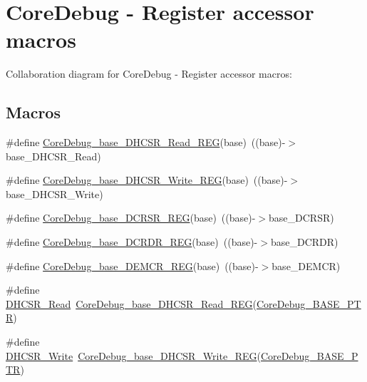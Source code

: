 \hypertarget{group___core_debug___register___accessor___macros}{}\section{Core\+Debug -\/ Register accessor macros}
\label{group___core_debug___register___accessor___macros}
Collaboration diagram for Core\+Debug -\/ Register accessor macros\+:
\subsection*{Macros}
\begin{DoxyCompactItemize}
\item 
\#define \hyperlink{group___core_debug___register___accessor___macros_gac833b7540ffafe000016ddc394a9d147}{Core\+Debug\+\_\+base\+\_\+\+D\+H\+C\+S\+R\+\_\+\+Read\+\_\+\+R\+EG}(base)~((base)-\/$>$base\+\_\+\+D\+H\+C\+S\+R\+\_\+\+Read)
\item 
\#define \hyperlink{group___core_debug___register___accessor___macros_ga47ea32822d2a6f5acea35f2d8859f111}{Core\+Debug\+\_\+base\+\_\+\+D\+H\+C\+S\+R\+\_\+\+Write\+\_\+\+R\+EG}(base)~((base)-\/$>$base\+\_\+\+D\+H\+C\+S\+R\+\_\+\+Write)
\item 
\#define \hyperlink{group___core_debug___register___accessor___macros_ga8b45e5b041ad90bbee03fb1431487fee}{Core\+Debug\+\_\+base\+\_\+\+D\+C\+R\+S\+R\+\_\+\+R\+EG}(base)~((base)-\/$>$base\+\_\+\+D\+C\+R\+SR)
\item 
\#define \hyperlink{group___core_debug___register___accessor___macros_ga3ee2f6e86a62ec00d4a06ecf8b320c5e}{Core\+Debug\+\_\+base\+\_\+\+D\+C\+R\+D\+R\+\_\+\+R\+EG}(base)~((base)-\/$>$base\+\_\+\+D\+C\+R\+DR)
\item 
\#define \hyperlink{group___core_debug___register___accessor___macros_gaa6db4a530be795b1cc9a41b12e98bb10}{Core\+Debug\+\_\+base\+\_\+\+D\+E\+M\+C\+R\+\_\+\+R\+EG}(base)~((base)-\/$>$base\+\_\+\+D\+E\+M\+CR)
\item 
\#define \hyperlink{group___core_debug___register___accessor___macros_ga7d77eafe76b2000c7159e58e11ade9a1}{D\+H\+C\+S\+R\+\_\+\+Read}~\hyperlink{group___core_debug___register___accessor___macros_gac833b7540ffafe000016ddc394a9d147}{Core\+Debug\+\_\+base\+\_\+\+D\+H\+C\+S\+R\+\_\+\+Read\+\_\+\+R\+EG}(\hyperlink{group___core_debug___peripheral_ga994a185afca30ede538d89322c4f0326}{Core\+Debug\+\_\+\+B\+A\+S\+E\+\_\+\+P\+TR})
\item 
\#define \hyperlink{group___core_debug___register___accessor___macros_ga3c374ff0f88587d03fd707ebc0a06169}{D\+H\+C\+S\+R\+\_\+\+Write}~\hyperlink{group___core_debug___register___accessor___macros_ga47ea32822d2a6f5acea35f2d8859f111}{Core\+Debug\+\_\+base\+\_\+\+D\+H\+C\+S\+R\+\_\+\+Write\+\_\+\+R\+EG}(\hyperlink{group___core_debug___peripheral_ga994a185afca30ede538d89322c4f0326}{Core\+Debug\+\_\+\+B\+A\+S\+E\+\_\+\+P\+TR})

\end{DoxyCompactItemize}
